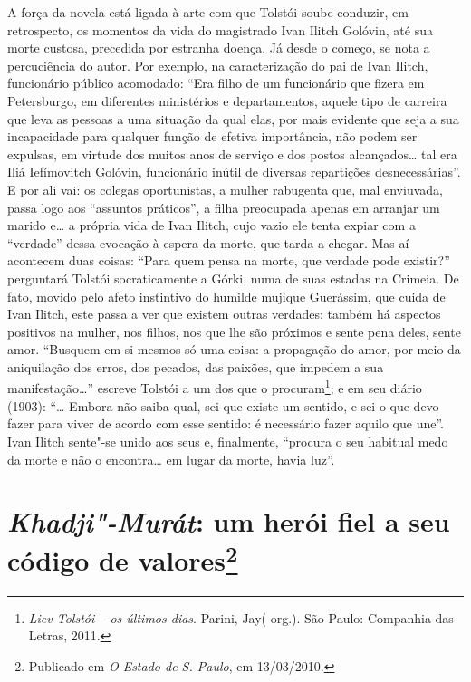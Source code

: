 {{A força da novela está ligada à arte com que
Tolstói soube conduzir, em retrospecto, os momentos da vida do
magistrado Ivan Ilitch Golóvin, até sua morte custosa, precedida por
estranha doença. Já desde o começo, se nota a percuciência do autor. Por
exemplo, na caracterização do pai de Ivan Ilitch, funcionário público
acomodado: ``Era filho de um funcionário que fizera em Petersburgo, em
diferentes ministérios e departamentos, aquele tipo de carreira que leva
as pessoas a uma situação da qual elas, por mais evidente que seja a sua
incapacidade para qualquer função de efetiva importância, não podem ser
expulsas, em virtude dos muitos anos de serviço e dos postos
alcançados\ldots{} tal era Iliá Iefímovitch Golóvin, funcionário inútil de
diversas repartições desnecessárias''. E por ali vai: os colegas
oportunistas, a mulher rabugenta que, mal enviuvada, passa logo aos ``assuntos práticos'', a filha preocupada apenas em arranjar um marido
e\ldots{} a própria vida de Ivan Ilitch, cujo vazio ele tenta expiar com a ``verdade'' dessa evocação à espera da morte, que tarda a chegar. Mas aí
acontecem duas coisas: ``Para quem pensa na morte, que verdade pode
existir?'' perguntará Tolstói socraticamente a Górki, numa de suas
estadas na Crimeia. De fato, movido pelo afeto instintivo do humilde
mujique Guerássim, que cuida de Ivan Ilitch, este passa a ver que
existem outras verdades: também há aspectos positivos na mulher, nos
filhos, nos que lhe são próximos e sente pena deles, sente amor.
``Busquem em si mesmos só uma coisa: a propagação do amor, por meio da
aniquilação dos erros, dos pecados, das paixões, que impedem a sua
manifestação\ldots{}'' escreve Tolstói a um dos que o procuram\footnote{\emph{Liev
Tolstói -- os últimos dias}. Parini, Jay( org.). São Paulo: Companhia das Letras, 2011.}; e em seu diário (1903): ``\ldots{} Embora não saiba qual, sei que existe um sentido, e sei o que devo
fazer para viver de acordo com esse sentido: é necessário fazer aquilo
que une''. Ivan Ilitch sente"-se unido aos seus e, finalmente, ``procura
o seu habitual medo da morte e não o encontra\ldots{} em lugar da morte,
havia luz''.

\chapter{\emph{Khadji"-Murát}: um herói fiel a seu código de
valores\footnote{Publicado em \emph{O Estado de S. Paulo}, em
  13/03/2010.}}

}}
